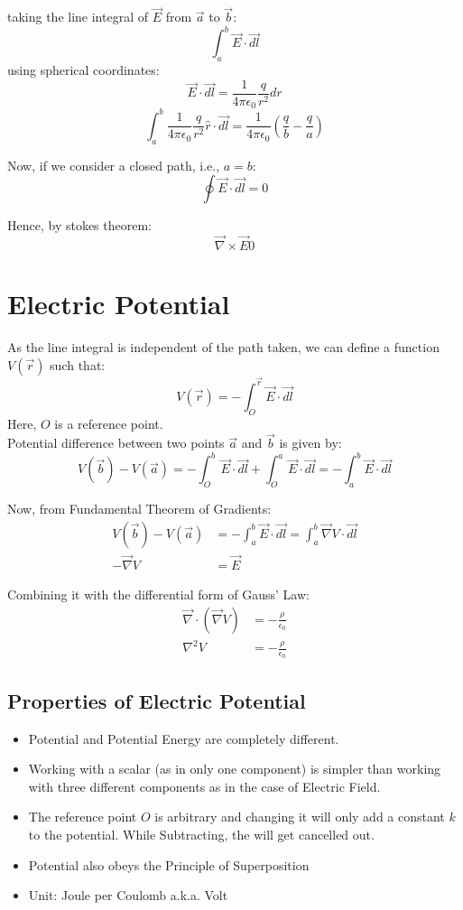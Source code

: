\documentclass{article}
\begin{document}
taking the line integral of $\vec{E}$ from $\vec{a}$ to $\vec{b}$:
\[  \int_{a}^{b} \vec{E} \cdot \vec{dl} \]
using spherical coordinates:
\[ \vec{E} \cdot \vec{dl} = \frac{1}{4 \pi\epsilon_0}\frac{q}{r^2} dr \]
\[ \int_{a}^{b} \frac{1}{4 \pi \epsilon_0} \frac{q}{r^2} \hat{r} \cdot \vec{dl} = \frac{1}{4 \pi \epsilon_0}\left(\frac{q}{b} - \frac{q}{a}\right)\]

Now, if we consider a closed path, i.e., $a = b$:
\[ \oint \vec{E} \cdot \vec{dl} = 0 \]

Hence, by stokes theorem:
\[ \vec{\nabla} \times \vec{E} 0 \]

\section{Electric Potential}
As the line integral is independent of the path taken, we can define a function $V(\vec{r})$ such that:
\[ V(\vec{r}) = -\int_{O}^{\vec{r}} \vec{E}\cdot \vec{dl} \]
Here, $O$ is a reference point.\\

Potential difference between two points $\vec{a}$ and $\vec{b}$ is given by:
\[ V(\vec{b}) - V(\vec{a}) = -\int_{O}^{b} \vec{E} \cdot \vec{dl} + \int_{O}^{a} \vec{E} \cdot \vec{dl} =-\int_{a}^{b} \vec{E} \cdot \vec{dl} \]

Now, from Fundamental Theorem of Gradients:
\begin{align*}
	V(\vec{b}) - V(\vec{a}) & = - \int_{a}^{b} \vec{E} \cdot \vec{dl} = \int_{a}^{b} \vec{\nabla} V \cdot \vec{dl} \\
	- \vec{\nabla}V         & = \vec{E}
\end{align*}

Combining it with the differential form of Gauss' Law:
\begin{align*}
	\vec{\nabla} \cdot \left(\vec{\nabla}V\right) & = -\frac{\rho}{\epsilon_0} \\
	\nabla^2 V                                    & = -\frac{\rho}{\epsilon_0}
\end{align*}

\subsection{Properties of Electric Potential}
\begin{itemize}
	\item Potential and Potential Energy are completely different.
	\item Working with a scalar (as in only one component) is simpler than working with three different components as in the case of Electric Field.
	\item The reference point $O$ is arbitrary and changing it will only add a constant $k$ to the potential.
	      While Subtracting, the will get cancelled out.
	\item Potential also obeys the Principle of Superposition
	\item Unit: Joule per Coulomb a.k.a. Volt
\end{itemize}
\end{document}
